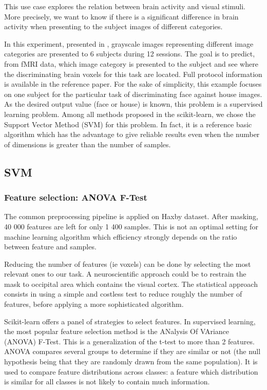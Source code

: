 \documentclass{frontiersSCNS} %
\newcounter{x}
\newcounter{y}
\newcounter{z}
\begin{document}
This use case explores the relation between brain activity and visual
stimuli. More precisely, we want to know if there is a significant difference
in brain activity when presenting to the subject images of different categories.

In this experiment, presented in \cite{haxby2001},
grayscale images representing different image categories
are presented to 6 subjects during 12 sessions. The goal is to predict,
from fMRI data, which image category is presented
to the subject and see where the discriminating brain voxels for this task are
located. Full protocol information is available in the reference paper.
For the sake of simplicity, this example focuses on one subject for the
particular task of discriminating face against house images.\\

As the desired output value (face or house) is known, this problem is a
supervised learning problem. Among all methods proposed in the scikit-learn, we
chose the Support Vector Method (SVM) for this problem. In fact, it is a
reference basic algorithm which has the advantage to
give reliable results even when the number of dimensions is greater than the
number of samples.

\subsection{SVM}

\subsubsection{Feature selection: ANOVA F-Test}

The common preprocessing pipeline is applied on Haxby dataset. After masking, 40
000 features are left for only 1 400 samples. This is not an optimal setting
for machine learning algorithm which efficiency strongly depends on the ratio
between feature and samples.

Reducing the number of features (ie voxels) can be done by selecting the most
relevant ones to our task. A neuroscientific approach could be to restrain the
mask to occipital area which contains the visual cortex. The statistical
approach consists in using a simple and costless test to reduce roughly the
number of features, before applying a more sophisticated algorithm.

Scikit-learn offers a panel of strategies to select features. In supervised
learning, the most popular feature selection method is the
ANalysis Of VAriance (ANOVA) F-Test. This is a generalization of the t-test to
more than 2 features.
ANOVA compares several groups to determine if they are similar or not (the null
hypothesis being that they are randomly drawn from the same population).
It is used to compare feature distributions across classes: a feature which
distribution is similar for all classes is not likely to contain much
information.
\end{document}
